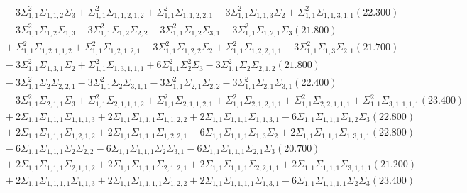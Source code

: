 \documentclass[12pt]{article}
\begin{document}
\begin{landscape}
\begin{align*}
		&\quad\quad -3\Sigma_{1,1}^{2}\Sigma_{1,1,2}\Sigma_{3}+\Sigma_{1,1}^{2}\Sigma_{1,1,2,1,2}+\Sigma_{1,1}^{2}\Sigma_{1,1,2,2,1}-3\Sigma_{1,1}^{2}\Sigma_{1,1,3}\Sigma_{2}+\Sigma_{1,1}^{2}\Sigma_{1,1,3,1,1}(22.300) \\ 
		&\quad\quad -3\Sigma_{1,1}^{2}\Sigma_{1,2}\Sigma_{1,3}-3\Sigma_{1,1}^{2}\Sigma_{1,2}\Sigma_{2,2}-3\Sigma_{1,1}^{2}\Sigma_{1,2}\Sigma_{3,1}-3\Sigma_{1,1}^{2}\Sigma_{1,2,1}\Sigma_{3}(21.800) \\ 
		&\quad\quad +\Sigma_{1,1}^{2}\Sigma_{1,2,1,1,2}+\Sigma_{1,1}^{2}\Sigma_{1,2,1,2,1}-3\Sigma_{1,1}^{2}\Sigma_{1,2,2}\Sigma_{2}+\Sigma_{1,1}^{2}\Sigma_{1,2,2,1,1}-3\Sigma_{1,1}^{2}\Sigma_{1,3}\Sigma_{2,1}(21.700) \\ 
		&\quad\quad -3\Sigma_{1,1}^{2}\Sigma_{1,3,1}\Sigma_{2}+\Sigma_{1,1}^{2}\Sigma_{1,3,1,1,1}+6\Sigma_{1,1}^{2}\Sigma_{2}^{2}\Sigma_{3}-3\Sigma_{1,1}^{2}\Sigma_{2}\Sigma_{2,1,2}(21.800) \\ 
		&\quad\quad -3\Sigma_{1,1}^{2}\Sigma_{2}\Sigma_{2,2,1}-3\Sigma_{1,1}^{2}\Sigma_{2}\Sigma_{3,1,1}-3\Sigma_{1,1}^{2}\Sigma_{2,1}\Sigma_{2,2}-3\Sigma_{1,1}^{2}\Sigma_{2,1}\Sigma_{3,1}(22.400) \\ 
		&\quad\quad -3\Sigma_{1,1}^{2}\Sigma_{2,1,1}\Sigma_{3}+\Sigma_{1,1}^{2}\Sigma_{2,1,1,1,2}+\Sigma_{1,1}^{2}\Sigma_{2,1,1,2,1}+\Sigma_{1,1}^{2}\Sigma_{2,1,2,1,1}+\Sigma_{1,1}^{2}\Sigma_{2,2,1,1,1}+\Sigma_{1,1}^{2}\Sigma_{3,1,1,1,1}(23.400) \\ 
		&\quad\quad +2\Sigma_{1,1}\Sigma_{1,1,1}\Sigma_{1,1,1,3}+2\Sigma_{1,1}\Sigma_{1,1,1}\Sigma_{1,1,2,2}+2\Sigma_{1,1}\Sigma_{1,1,1}\Sigma_{1,1,3,1}-6\Sigma_{1,1}\Sigma_{1,1,1}\Sigma_{1,2}\Sigma_{3}(22.800) \\ 
		&\quad\quad +2\Sigma_{1,1}\Sigma_{1,1,1}\Sigma_{1,2,1,2}+2\Sigma_{1,1}\Sigma_{1,1,1}\Sigma_{1,2,2,1}-6\Sigma_{1,1}\Sigma_{1,1,1}\Sigma_{1,3}\Sigma_{2}+2\Sigma_{1,1}\Sigma_{1,1,1}\Sigma_{1,3,1,1}(22.800) \\ 
		&\quad\quad -6\Sigma_{1,1}\Sigma_{1,1,1}\Sigma_{2}\Sigma_{2,2}-6\Sigma_{1,1}\Sigma_{1,1,1}\Sigma_{2}\Sigma_{3,1}-6\Sigma_{1,1}\Sigma_{1,1,1}\Sigma_{2,1}\Sigma_{3}(20.700) \\ 
		&\quad\quad +2\Sigma_{1,1}\Sigma_{1,1,1}\Sigma_{2,1,1,2}+2\Sigma_{1,1}\Sigma_{1,1,1}\Sigma_{2,1,2,1}+2\Sigma_{1,1}\Sigma_{1,1,1}\Sigma_{2,2,1,1}+2\Sigma_{1,1}\Sigma_{1,1,1}\Sigma_{3,1,1,1}(21.200) \\ 
		&\quad\quad +2\Sigma_{1,1}\Sigma_{1,1,1,1}\Sigma_{1,1,3}+2\Sigma_{1,1}\Sigma_{1,1,1,1}\Sigma_{1,2,2}+2\Sigma_{1,1}\Sigma_{1,1,1,1}\Sigma_{1,3,1}-6\Sigma_{1,1}\Sigma_{1,1,1,1}\Sigma_{2}\Sigma_{3}(23.400) \\ 

\end{align*}
\end{landscape}
\end{document}

